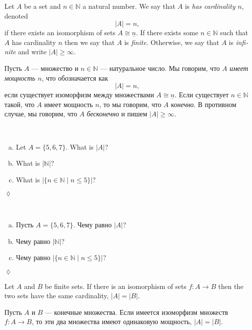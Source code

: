 \documentclass{book}
\def\NN{{\mathbb N}}
\def\to{\rightarrow}
\def\taking{\colon}
\def\iso{\cong}
\def\|{{\;|\;}}
\def\ul{\underline}
\theoremstyle{theoremENG}
\theoremstyle{lemmaENG}
\newtheorem{lemmaENG}[subsubsection]{\begin{english}Lemma\end{english}}
\theoremstyle{propositionENG}
\theoremstyle{corollaryENG}
\theoremstyle{factENG}
\theoremstyle{remarkENG}
\theoremstyle{exampleENG}
\theoremstyle{warningENG}
\theoremstyle{questionENG}
\theoremstyle{guessENG}
\theoremstyle{answerENG}
\theoremstyle{constructionENG}
\theoremstyle{rulesENG}
\theoremstyle{excENG}
\newtheorem{excENG}[subsubsection]{\begin{english}Exercise\end{english}}
\theoremstyle{appENG}
\theoremstyle{definitionENG}
\newtheorem{definitionENG}[subsubsection]{\begin{english}Definition\end{english}}
\theoremstyle{notationENG}
\theoremstyle{conjectureENG}
\theoremstyle{postulateENG}
\newenvironment{exerciseENG}{\begin{excENG}}{\hspace*{\fill}$\lozenge$\end{excENG}}
\theoremstyle{theoremRUS}
\theoremstyle{lemmaRUS}
\newtheorem{lemmaRUS}[subsubsection]{\begin{russian}Лемма\end{russian}}
\theoremstyle{propositionRUS}
\theoremstyle{corollaryRUS}
\theoremstyle{factRUS}
\theoremstyle{remarkRUS}
\theoremstyle{exampleRUS}
\theoremstyle{warningRUS}
\theoremstyle{questionRUS}
\theoremstyle{guessRUS}
\theoremstyle{answerRUS}
\theoremstyle{constructionRUS}
\theoremstyle{rulesRUS}
\theoremstyle{excRUS}
\newtheorem{excRUS}[subsubsection]{\begin{russian}Упражнение\end{russian}}
\theoremstyle{appRUS}
\theoremstyle{definitionRUS}
\newtheorem{definitionRUS}[subsubsection]{\begin{russian}Определение\end{russian}}
\theoremstyle{notationRUS}
\theoremstyle{conjectureRUS}
\theoremstyle{postulateRUS}
\newenvironment{exerciseRUS}{\begin{excRUS}}{\hspace*{\fill}$\lozenge$\end{excRUS}}
\def\sexc{\begin{enumerate}[a.)]\setlength{\itemsep}{.1cm}\setlength{\parskip}{.1cm}\item}
\def\next{\item}
\def\endsexc{\end{enumerate}}
\begin{document}
\begin{english}
\begin{definitionENG}\label{def:cardinality}
Let $A$ be a set and $n\in\NN$ a natural number. We say that $A$ is {\em has cardinality $n$}, denoted $$|A|=n,$$ if there exists an isomorphism of sets $A\iso\ul{n}$. If there exists some $n\in\NN$ such that $A$ has cardinality $n$ then we say that $A$ is {\em finite}. Otherwise, we say that $A$ is {\em infinite} and write $|A|\geq\infty$.
\end{definitionENG}

\begin{definitionRUS}\label{def:cardinality}
\begin{russian}
Пусть $A$ — множество и $n\in\NN$ — натуральное число. Мы говорим, что $A$ {\em имеет мощность $n$}, что обозначается как $$|A|=n,$$ если существует изоморфизм между множествами $A\iso\ul{n}$. Если существует $n\in\NN$ такой, что $A$ имеет мощность $n$, то мы говорим, что $A$ {\em конечно}. В противном случае, мы говорим, что $A$ {\em бесконечно} и пишем $|A|\geq\infty$.
\end{russian}
\end{definitionRUS}

\begin{exerciseENG}~
\sexc Let $A=\{5,6,7\}$. What is $|A|$? 
\next What is $|\NN|$? 
\next What is $|\{n\in\NN\|n\leq 5\}|$?
\endsexc
\end{exerciseENG}

\begin{exerciseRUS}~
\begin{russian}
\sexc Пусть $A=\{5,6,7\}$. Чему равно $|A|$? 
\next Чему равно $|\NN|$? 
\next Чему равно $|\{n\in\NN\|n\leq 5\}|$?
\endsexc
\end{russian}
\end{exerciseRUS}

\begin{lemmaENG}
Let $A$ and $B$ be finite sets. If there is an isomorphism of sets $f\taking A\to B$ then the two sets have the same cardinality, $|A|=|B|$.
\end{lemmaENG}

\begin{lemmaRUS}
\begin{russian}Пусть $A$ и $B$ — конечные множества. Если имеется изоморфизм множеств $f\taking A\to B$, то эти два множества имеют одинаковую мощность, $|A|=|B|$. \end{russian}
\end{lemmaRUS}


\end{english}
\end{document}

